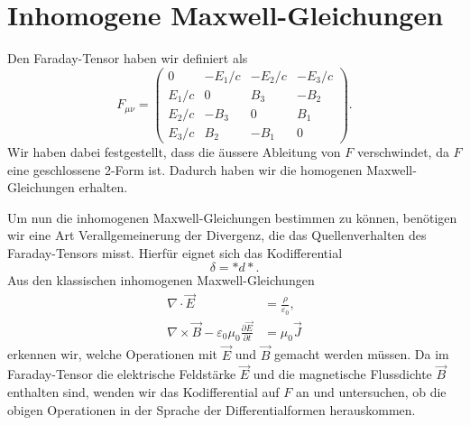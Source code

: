 %
%
%
%
\section{Inhomogene Maxwell-Gleichungen
	\label{maxwell:section:InhomogeneMaxwellgleichungen}}
Den Faraday-Tensor haben wir definiert als
\begin{equation*}
	F_{\mu \nu} = \begin{pmatrix}
		0 & -E_1/c & -E_2/c & -E_3/c \\ E_1/c & 0 & B_3 & -B_2 \\ E_2/c & -B_3 & 0 & B_1 \\ E_3/c & B_2 & -B_1 & 0 
	\end{pmatrix}.
\end{equation*}
Wir haben dabei festgestellt, dass die äussere Ableitung von $F$ verschwindet, da $F$ eine geschlossene 2-Form ist. Dadurch haben wir die homogenen Maxwell-Gleichungen erhalten. 

Um nun die inhomogenen Maxwell-Gleichungen bestimmen zu können, benötigen wir eine Art Verallgemeinerung der Divergenz, die das Quellenverhalten des Faraday-Tensors misst. Hierfür eignet sich das Kodifferential
\begin{equation*}
	\delta = \ast d {\ast}.
\end{equation*}
Aus den klassischen inhomogenen Maxwell-Gleichungen
\begin{align}
	\nabla \cdot \vec{E} &= \frac{\rho}{\varepsilon_0}
	\label{maxwell:section:inhomogeneMaxwellgleichungen:gaussE},\\
	\nabla \times \vec{B} - \varepsilon_0 \mu_0 \frac{\partial \vec{E}}{\partial t}&= \mu_0 \vec{J}
	\label{maxwell:section:inhomogeneMaxwellgleichungen:ampereMaxwell}
\end{align}
erkennen wir, welche Operationen mit $\vec{E}$ und $\vec{B}$ gemacht werden müssen.
Da im Faraday-Tensor die elektrische Feldstärke $\vec{E}$ und die magnetische Flussdichte $\vec{B}$ enthalten sind, wenden wir das Kodifferential auf $F$ an und untersuchen, ob die obigen Operationen in der Sprache der Differentialformen herauskommen.

